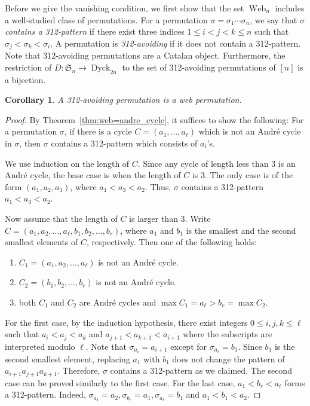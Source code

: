 \documentclass[reqno,12pt]{amsart}
\newtheorem{cor}[thm]{Corollary}
\theoremstyle{definition}
\theoremstyle{remark}
\newcommand\Dyck{\operatorname{Dyck}}
\newcommand\Web{\operatorname{Web}}
\newcommand\SYM{\mathfrak{S}}
\begin{document}
Before we give the vanishing condition,
we first show that the set \( \Web_n \) includes a well-studied class of permutations.
For a permutation \( \sigma = \sigma_1\cdots \sigma_n \),
we say that \emph{\( \sigma \) contains a 312-pattern} if there exist three indices
\( 1\le i<j<k\le n \) such that \( \sigma_j<\sigma_k<\sigma_i \).
A permutation is \emph{312-avoiding} if it does not contain a 312-pattern.
Note that 312-avoiding permutations are a Catalan object. Furthermore,
the restriction of \( D:\SYM_n\rightarrow \Dyck_{2n} \) to the set of
312-avoiding permutations of \( [n] \) is a bijection.
\begin{cor}\label{cor:312-avoiding}
  A 312-avoiding permutation is a web permutation.
\end{cor}
\begin{proof}
  By Theorem~\ref{thm:web=andre_cycle}, it suffices to show the following: 
  For a permutation \( \sigma \), if there is a cycle \(C=(a_1,\dots,a_\ell)\) which is not an Andr\'e cycle in \(\sigma\), then \(\sigma\) contains a 312-pattern which consists of $a_i$'s.

  We use induction on the length of \(C\).
  Since any cycle of length less than 3 is an Andr\'e cycle, the base case is when the length of \(C\) is 3. 
  The only case is of the form \((a_1,a_2,a_3)\), where \(a_1<a_3<a_2\). 
  Thus, \(\sigma\) contains a 312-pattern \(a_1<a_3<a_2\).

  Now assume that the length of \(C\) is larger than 3.
  Write \(C=(a_1,a_2,\dots,a_\ell, b_1,b_2,\dots,b_r)\), where \( a_1 \) and \( b_1 \) is the smallest and the second smallest elements of
  \( C \), respectively.
  Then one of the following holds:
  \begin{enumerate}[label=\roman*)]
    \item \(C_1=(a_1,a_2,\dots,a_\ell)\) is not an Andr\'e cycle.
    \item \(C_2=(b_1,b_2,\dots,b_r)\) is not an Andr\'e cycle.
    \item both \(C_1\) and \(C_2\) are Andr\'e cycles and $\max C_1=a_\ell>b_{r}=\max C_2$.
  \end{enumerate}
  
  For the first case, by the induction hypothesis, 
  there exist integers $0\le i,j,k\le\ell$ such that \(a_i<a_j<a_k\) and \(a_{j+1}<a_{k+1}<a_{i+1}\) where the subscripts are interpreted modulo $\ell$.
  Note that \(\sigma_{a_i}=a_{i+1}\) except for \(\sigma_{a_\ell}=b_1\). 
  Since $b_1$ is the second smallest element, replacing $a_1$ with $b_1$ does not change the pattern of \({a_{i+1}}{a_{j+1}}{a_{k+1}}\).
  Therefore, \(\sigma\) contains a 312-pattern as we claimed.
  The second case can be proved similarly to the first case.
  For the last case, $a_1<b_r<a_\ell$ forms a 312-pattern. 
  Indeed, $\sigma_{a_1}=a_2, \sigma_{b_r}=a_1, \sigma_{a_\ell}=b_1$ and $a_1<b_1<a_2$.
\end{proof}
\end{document}
